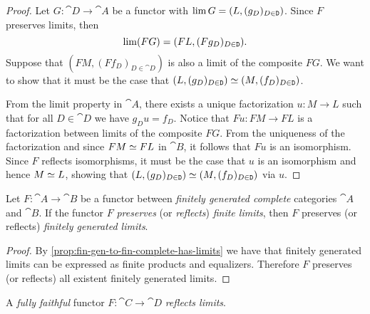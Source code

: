 \begin{proof}
    Let \(G: \cat D \to \cat A\) be a functor with \(\operatorname{lim} G = (L, (g_D)_{D \in \texttt
            D})\). Since \(F\) preserves limits, then
    \[
        \operatorname{lim}(FG) = (F L, (F g_D)_{D \in \texttt D}).
    \]
    Suppose that \((F M, (F f_D)_{D \in \cat D})\) is also a limit of the composite
    \(F G\). We want to show that it must be the case that
    \((L, (g_D)_{D \in \texttt D}) \simeq (M, (f_D)_{D \in \texttt D})\).

    From the limit property in \(\cat A\), there exists a unique factorization
    \(u: M \to L\) such that for all \(D \in \cat D\) we have \(g_D u =
    f_D\). Notice that \(F u: FM \to FL\) is a factorization between limits of the
    composite \(F G\). From the uniqueness of the factorization and since
    \(F M \simeq F L\) in \(\cat B\), it follows that \(F u\) is an isomorphism. Since
    \(F\) reflects isomorphisms, it must be the case that \(u\) is an isomorphism
    and hence \(M \simeq L\), showing that
    \((L, (g_D)_{D \in \texttt D}) \simeq (M, (f_D)_{D \in \texttt D})\) via \(u\).
\end{proof}

\begin{proposition}
    \label{prop:finitely-gen-limits-preserve-reflect}
    Let \(F: \cat A \to \cat B\) be a functor between \emph{finitely generated
        complete} categories \(\cat A\) and \(\cat B\). If the functor \(F\)
    \emph{preserves} (or \emph{reflects}) \emph{finite limits}, then \(F\) preserves
    (or reflects) \emph{finitely generated limits}.
\end{proposition}

\begin{proof}
    By \cref{prop:fin-gen-to-fin-complete-has-limits} we have that finitely
    generated limits can be expressed as finite products and equalizers. Therefore
    \(F\) preserves (or reflects) all existent finitely generated limits.
\end{proof}

\begin{proposition}
    \label{prop:full-faithful-reflects}
    A \emph{fully faithful} functor \(F: \cat C \to \cat D\)
    \emph{reflects limits}.
\end{proposition}

